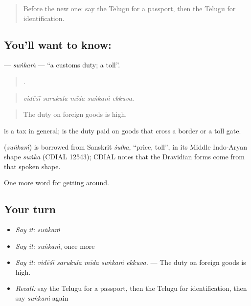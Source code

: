 \label{lesson:TE-C441-sunkam}



\begin{quote}
Before the new one: say the Telugu for a passport, then the Telugu for identification.
\end{quote}

\subsection*{You'll want to know: }
\textbf{} — \emph{suṅkaṁ} — \textquotedblleft{}a customs duty; a toll\textquotedblright{}.

\begin{quote}
    .
\end{quote}

\begin{quote}
\emph{vidēśī sarukula mīda suṅkaṁ ekkuva.}
\end{quote}

\begin{quote}
The duty on foreign goods is high.
\end{quote}

 is a tax in general;  is the duty paid on goods that cross a border or a toll gate.

\begin{cousinweb}
\textbf{} (\emph{suṅkaṁ}) is borrowed from Sanskrit \emph{śulka}, \textquotedblleft{}price, toll\textquotedblright{}, in its Middle Indo-Aryan shape \emph{suṅka} (CDIAL 12543); CDIAL notes that the Dravidian forms come from that spoken shape.
\end{cousinweb}

\begin{grammarlens}[title={What you've built}]
One more word for getting around.
\end{grammarlens}

\subsection*{Your turn}
\begin{itemize}
\raggedright
  \item \emph{Say it:} \emph{suṅkaṁ}
  \item \emph{Say it:} \emph{suṅkaṁ}, once more
  \item \emph{Say it:} \emph{vidēśī sarukula mīda suṅkaṁ ekkuva.} — The duty on foreign goods is high.
  \item \emph{Recall:} say the Telugu for a passport, then the Telugu for identification, then say \emph{suṅkaṁ} again
\end{itemize}

